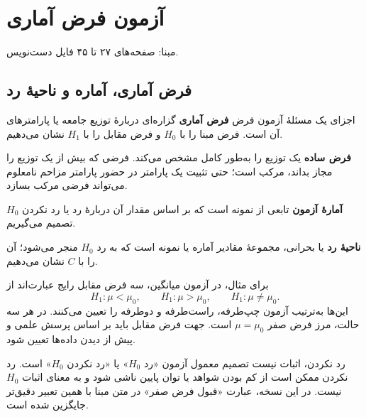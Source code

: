 \documentclass[12pt,a4paper,oneside]{report}
\newcounter{ex}[chapter]
\newcommand{\source}[1]{\par{\small\color{muted} مبنا: صفحه‌های #1 فایل دست‌نویس.}\par}
\begin{document}
\chapter{آزمون فرض آماری}
\source{۲۷ تا ۴۵}
\section{فرض آماری، آماره و ناحیهٔ رد}
\begin{definition}{اجزای یک مسئلهٔ آزمون فرض}
\textbf{فرض آماری} گزاره‌ای دربارهٔ توزیع جامعه یا پارامترهای آن است. فرض مبنا را با $H_0$ و فرض مقابل را با $H_1$ نشان می‌دهیم.

\textbf{فرض ساده} یک توزیع را به‌طور کامل مشخص می‌کند. فرضی که بیش از یک توزیع را مجاز بداند، مرکب است؛ حتی تثبیت یک پارامتر در حضور پارامتر مزاحم نامعلوم می‌تواند فرضی مرکب بسازد.

\textbf{آمارهٔ آزمون} تابعی از نمونه است که بر اساس مقدار آن دربارهٔ رد یا رد نکردن $H_0$ تصمیم می‌گیریم.

\textbf{ناحیهٔ رد} یا بحرانی، مجموعهٔ مقادیر آماره یا نمونه است که به رد $H_0$ منجر می‌شود؛ آن را با $C$ نشان می‌دهیم.
\end{definition}
برای مثال، در آزمون میانگین، سه فرض مقابل رایج عبارت‌اند از
\[
H_1:\mu<\mu_0,\qquad H_1:\mu>\mu_0,\qquad H_1:\mu\ne\mu_0.
\]
این‌ها به‌ترتیب آزمون چپ‌طرفه، راست‌طرفه و دوطرفه را تعیین می‌کنند. در هر سه حالت، مرز فرض صفر $\mu=\mu_0$ است. جهت فرض مقابل باید بر اساس پرسش علمی و پیش از دیدن داده‌ها تعیین شود.
\begin{important}{رد نکردن، اثبات نیست}
تصمیم معمول آزمون «رد $H_0$» یا «رد نکردن $H_0$» است. رد نکردن ممکن است از کم بودن شواهد یا توان پایین ناشی شود و به معنای اثبات $H_0$ نیست. در این نسخه، عبارت «قبول فرض صفر» در متن مبنا با همین تعبیر دقیق‌تر جایگزین شده است.
\end{important}
\end{document}
